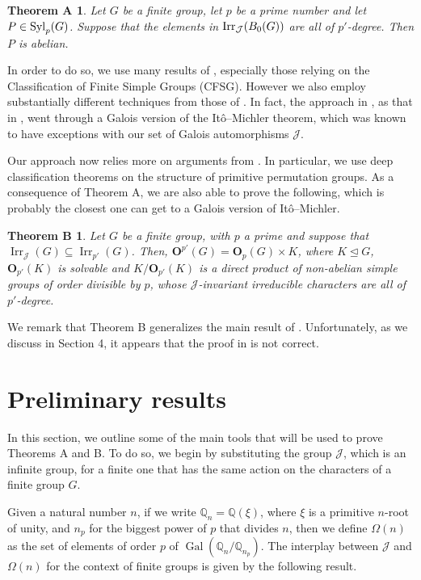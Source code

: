 \documentclass[12pt]{amsart}
\theoremstyle{theorem}
\newtheorem*{thmA}{Theorem A}
\newtheorem*{thmB}{Theorem B}
\theoremstyle{definition}
\newcommand{\bO}{{\mathbf O}}
\newcommand{\Irr}{{\operatorname{Irr}}}
\begin{document}
	\begin{thmA}
		Let $G$ be a finite group, let $p$ be a prime number and let $P\in{\rm Syl}_p(G)$. Suppose that the elements in ${\rm Irr}_{\mathcal{J}}(B_0(G))$ are all of $p'$-degree. Then $P$ is abelian.
	\end{thmA}

	
	In order to do so, we use many results of \cite{MMRSF}, especially those relying on the Classification of Finite Simple Groups (CFSG). However we also employ substantially different techniques from those of \cite{MMRSF}. In fact, the approach in \cite{MMRSF}, as that in \cite{MN}, went through a Galois version of the It\^o--Michler theorem, which was known to have  exceptions with our set of Galois automorphisms $\mathcal{J}$. 
	
Our approach now relies more on arguments from \cite{MinimalHeights}. In particular, we use deep classification theorems on the structure of primitive permutation groups. As a consequence of Theorem A, we are also able to prove the following, which is probably the closest one can get to a Galois version of It\^o--Michler.
	
	\begin{thmB}
		Let $G$ be a finite group, with $p$ a prime and suppose that $\Irr_{\mathcal{J}}(G) \subseteq \Irr_{p'}(G)$.
		Then, $\bO^{p'}(G) = \bO_p(G) \times K$, where $K \unlhd G$, $\bO_{p'}(K)$ is solvable and $K/\bO_{p'}(K)$ is a direct product of non-abelian simple groups of order divisible by $p$, whose $\mathcal{J}$-invariant irreducible characters are all of $p'$-degree.
	\end{thmB}
	
	We remark that Theorem B  generalizes the main result of \cite{Grit}. Unfortunately, as we discuss in Section 4, it appears that the proof in \cite{Grit} is not correct.
	

	\section{Preliminary results}
	
	In this section, we outline some of the main tools that will be used to prove Theorems A and B. To do so, we begin by substituting the group $\mathcal{J}$, which is an infinite group, for a finite one that has the same action on the characters of a finite group $G$.
	
	Given a natural number $n$, if we write $\mathbb{Q}_n = \mathbb{Q}(\xi)$, where $\xi$ is a primitive $n$-root of unity, and $n_p$ for the biggest power of $p$ that divides $n$, then we define $\Omega(n)$ as the set of elements of order $p$ of $\operatorname{Gal}(\mathbb{Q}_n/\mathbb{Q}_{n_p})$. The interplay between $\mathcal{J}$ and $\Omega(n)$ for the context of finite groups is given by the following result.
	
\end{document}
